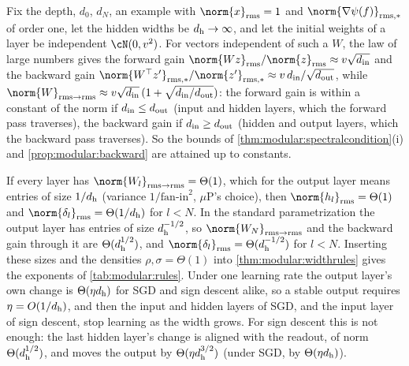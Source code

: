 \begin{refsection}
\begin{heuristic}
Fix the depth, $d_0$, $d_N$, an example with $\norm{x}_\rms=1$ and $\norm{\nabla\psi(f)}_{\rms,*}$ of order one, let the hidden widths be $d_{\mathrm h}\to\infty$, and let the initial weights of a layer be independent $\cN(0,v^2)$. For vectors independent of such a $W$, the law of large numbers gives the forward gain $\norm{Wz}_\rms/\norm{z}_\rms\approx v\sqrt{\modularin}$ and the backward gain $\norm{W^\top z'}_{\rms,*}/\norm{z'}_{\rms,*}\approx v\,\modularin/\sqrt{\modularout}$, while $\norm{W}_{\rms\to\rms}\approx v\sqrt{\modularin}\,(1+\sqrt{\modularin/\modularout})$: the forward gain is within a constant of the norm if $d_{\mathrm{in}}\le d_{\mathrm{out}}$ (input and hidden layers, which the forward pass traverses), the backward gain if $d_{\mathrm{in}}\ge d_{\mathrm{out}}$ (hidden and output layers, which the backward pass traverses). So the bounds of \cref{thm:modular:spectralcondition}(i) and \cref{prop:modular:backward} are attained up to constants.

If every layer has $\norm{W_l}_{\rms\to\rms}=\Theta(1)$, which for the output layer means entries of size $1/d_{\mathrm h}$ (variance $1/\text{fan-in}^2$, $\mu$P's choice), then $\norm{h_l}_\rms=\Theta(1)$ and $\norm{\delta_l}_\rms=\Theta(1/\modularh)$ for $l<N$. In the standard parametrization the output layer has entries of size $d_{\mathrm h}^{-1/2}$, so $\norm{W_N}_{\rms\to\rms}$ and the backward gain through it are $\Theta(d_{\mathrm h}^{1/2})$, and $\norm{\delta_l}_\rms=\Theta(\modularh^{-1/2})$ for $l<N$. Inserting these sizes and the densities $\rho,\sigma=\Theta(1)$ into \cref{thm:modular:widthrules} gives the exponents of \cref{tab:modular:rules}. Under one learning rate the output layer's own change is $\Theta(\eta d_{\mathrm h})$ for SGD and sign descent alike, so a stable output requires $\eta=O(1/d_{\mathrm h})$, and then the input and hidden layers of SGD, and the input layer of sign descent, stop learning as the width grows. For sign descent this is not enough: the last hidden layer's change is aligned with the readout, of norm $\Theta(d_{\mathrm h}^{1/2})$, and moves the output by $\Theta(\eta d_{\mathrm h}^{3/2})$ (under SGD, by $\Theta(\eta d_{\mathrm h})$).
\end{heuristic}


\end{refsection}
